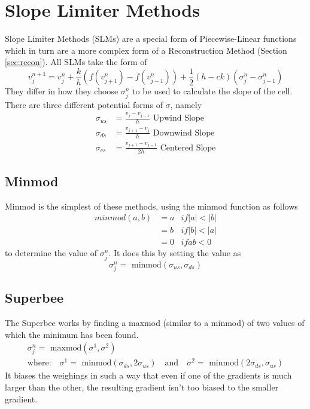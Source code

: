 \section{Slope Limiter Methods}
Slope Limiter Methods (SLMs) are a special form of Piecewise-Linear functions which in turn are a more complex form of a Reconstruction Method (Section \ref{sec:recon}). All SLMs take the form of
\begin{equation}\label{eq:slm}
  v^{n+1}_j = v^n_j + \frac{k}{h}(f(v^n_{j+1}) - f(v^n_{j-1})) + \frac{1}{2}(h-ck)(\sigma^n_j - \sigma^n_{j-1})
\end{equation}
They differ in how they choose $\sigma^n_j$ to be used to calculate the slope of the cell. There are three different potential forms of $\sigma$, namely
\begin{align*}
  \sigma_{us} &= \frac{v_j     - v_{j-1}}{h} \text{ Upwind Slope}  \\
  \sigma_{ds} &= \frac{v_{j+1} - v_j}{h} \text{ Downwind Slope} \\
  \sigma_{cs} &= \frac{v_{j+1} - v_{j-1}}{2h} \text{ Centered Slope}
\end{align*}
\subsection{Minmod}
Minmod is the simplest of these methods, using the minmod function as follows
\begin{align*}
  minmod(a,b)   &= a &if |a| < |b|\\
                &= b &if |b| < |a|\\
                &= 0 &if ab < 0
\end{align*}
to determine the value of $\sigma^n_j$. It does this by setting the value as
\begin{equation*}
  \sigma^n_j = \text{ minmod}(\sigma_{us},\sigma_{ds})
\end{equation*}
\subsection{Superbee}
The Superbee works by finding a maxmod (similar to a minmod) of two values of which the minimum has been found.
\begin{gather*}
  \sigma^n_j = \text{ maxmod}(\sigma^1,\sigma^2) \\
  \text{where:} \quad \sigma^1 = \text{ minmod}(\sigma_{ds},2\sigma_{us}) \quad \text{and} \quad \sigma^2 = \text{ minmod}(2\sigma_{ds},\sigma_{us})
\end{gather*}
It biases the weighings in such a way that even if one of the gradients is much larger than the other, the resulting gradient isn't too biased to the smaller gradient.
